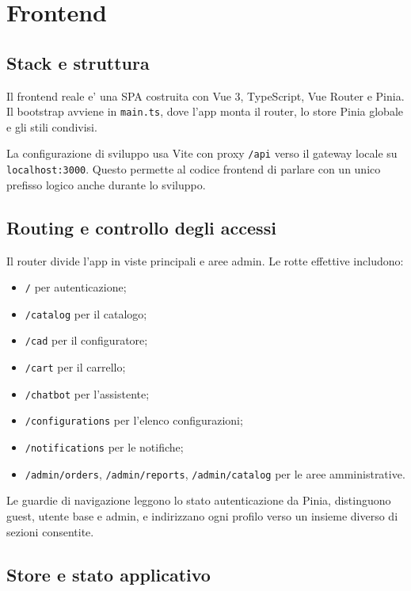 \chapter{Frontend}

\section{Stack e struttura}

Il frontend reale e' una SPA costruita con Vue 3, TypeScript, Vue Router e Pinia. Il bootstrap avviene in \texttt{main.ts}, dove l'app monta il router, lo store Pinia globale e gli stili condivisi.

La configurazione di sviluppo usa Vite con proxy \texttt{/api} verso il gateway locale su \texttt{localhost:3000}. Questo permette al codice frontend di parlare con un unico prefisso logico anche durante lo sviluppo.

\section{Routing e controllo degli accessi}

Il router divide l'app in viste principali e aree admin. Le rotte effettive includono:

\begin{itemize}
\item \texttt{/} per autenticazione;
\item \texttt{/catalog} per il catalogo;
\item \texttt{/cad} per il configuratore;
\item \texttt{/cart} per il carrello;
\item \texttt{/chatbot} per l'assistente;
\item \texttt{/configurations} per l'elenco configurazioni;
\item \texttt{/notifications} per le notifiche;
\item \texttt{/admin/orders}, \texttt{/admin/reports}, \texttt{/admin/catalog} per le aree amministrative.
\end{itemize}

Le guardie di navigazione leggono lo stato autenticazione da Pinia, distinguono guest, utente base e admin, e indirizzano ogni profilo verso un insieme diverso di sezioni consentite.

\section{Store e stato applicativo}

